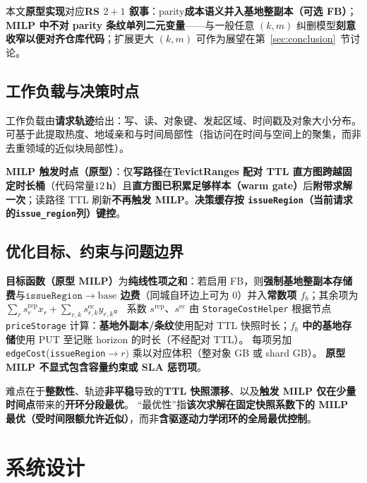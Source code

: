 \documentclass[conference]{IEEEtran}
\begin{document}
本文\textbf{原型实现}对应\textbf{RS $2{+}1$ 叙事}：parity\textbf{成本语义并入基地整副本（可选 FB）}；\textbf{MILP 中不对 parity 条纹单列二元变量}——与一般任意 $(k,m)$ 纠删模型\textbf{刻意收窄以便对齐仓库代码}；扩展更大 $(k,m)$ 可作为展望在第~\ref{sec:conclusion}~节讨论。

\subsection{工作负载与决策时点}
工作负载由\textbf{请求轨迹}给出：写、读、对象键、发起区域、时间戳及对象大小分布。
可基于此提取热度、地域亲和与时间局部性（指访问在时间与空间上的聚集，而非去重领域的近似块局部性）。

\textbf{MILP 触发时点（原型）}：仅\textbf{写路径}在\textbf{TevictRanges 配对 TTL 直方图跨越固定时长桶}（代码常量\textbf{$12$\,h}）且\textbf{直方图已积累足够样本（warm gate）}后\textbf{附带求解一次}；读路径 TTL 刷新\textbf{不再触发 MILP}。\textbf{决策缓存按 \texttt{issueRegion}（当前请求的\texttt{issue\_region}列）键控}。

\subsection{优化目标、约束与问题边界}
\textbf{目标函数（原型 MILP）}为\textbf{纯线性项之和}：若启用 FB，则\textbf{强制基地整副本存储费}与\textbf{$\texttt{issueRegion}{\rightarrow}\mathrm{base}$ 边费}（同城自环边上可为 $0$）并入\textbf{常数项 $f_b$}；其余项为\textbf{$\sum_r s^{\mathrm{rep}}_r x_r+\sum_{r,k}s^{\mathrm{ec}}_{r,k}y_{r,k}$}。
系数 $s^{\mathrm{rep}}$、$s^{\mathrm{ec}}$ 由 \texttt{StorageCostHelper} 根据节点 \texttt{priceStorage} 计算：\textbf{基地外副本/条纹}使用配对 TTL 快照时长；\textbf{$f_b$ 中的基地存储}使用 PUT 至记账 horizon 的时长（不经配对 TTL）。
每项另加 \texttt{edgeCost}(\texttt{issueRegion}$\rightarrow r)$ 乘以对应体积（整对象 GB 或 shard GB）。
\textbf{原型 MILP 不显式包含容量约束或 SLA 惩罚项}。

难点在于\textbf{整数性}、轨迹\textbf{非平稳}导致的\textbf{TTL 快照漂移}、以及\textbf{触发 MILP 仅在少量时间点}带来的\textbf{开环分段最优}。
``最优性''指\textbf{该次求解在固定快照系数下的 MILP 最优（受时间限额允许近似）}，而非\textbf{含驱逐动力学闭环的全局最优控制}。

\section{系统设计}
\label{sec:design}
\end{document}
